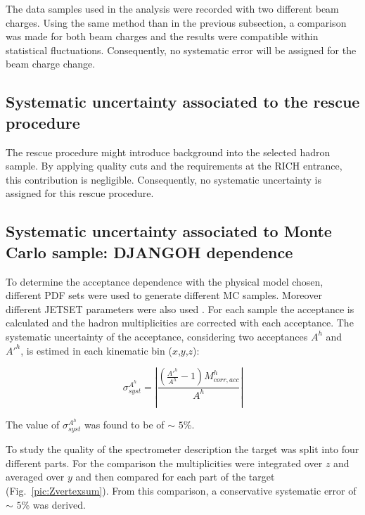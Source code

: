 The data samples used in the analysis were recorded with two different beam charges. Using the same method than in the previous subsection, a comparison was made for both beam charges and the results were compatible within statistical fluctuations. Consequently, no systematic error will be assigned for the beam charge change.


\subsection{Systematic uncertainty associated to the rescue procedure}


The rescue procedure might introduce background into the selected hadron sample. By applying quality cuts and the requirements at the RICH entrance, this contribution is negligible. Consequently, no systematic uncertainty is assigned for this rescue procedure.


\subsection{Systematic uncertainty associated to Monte Carlo sample: DJANGOH dependence}

To determine the acceptance dependence with the physical model chosen, different PDF sets were used to generate different MC samples. Moreover different JETSET parameters were also used \cite{PDFsys}. For each sample the acceptance is calculated and the hadron multiplicities are corrected with each acceptance. The systematic uncertainty of the acceptance, considering two acceptances $A^h$ and $A'^h$, is estimed in each kinematic bin ($x$,$y$,$z$):

\begin{equation}
  \sigma^{A^h}_{syst} = \left| \frac{\left(\frac{A'^h}{A^h}-1 \right)M^h_{corr,acc}}{A^h} \right|
\end{equation}

The value of $\sigma^{A^h}_{syst}$ was found to be of $\sim$ $5$\%.

To study the quality of the spectrometer description the target was split into four different parts. For the comparison the multiplicities were integrated over $z$ and averaged over $y$ and then compared for each part of the target (Fig.~\ref{pic:Zvertexsum}). From this comparison, a conservative systematic error of $\sim$ $5$\% was derived.

